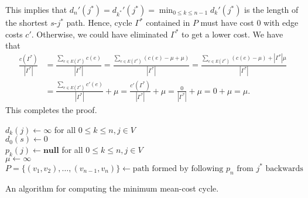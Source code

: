 \documentclass[letterpaper,reqno,12pt]{article}
\begin{document}
\begin{exercise}
  This implies that $d_n'(j^*) = d_{k^*}'(j^*) = \min_{0 \leq k \leq n - 1} d_k'(j^*)$ is the length of the shortest $s$-$j^*$ path. Hence, cycle $\Gamma^*$ contained in $P$ must have cost $0$ with edge costs $c'$. Otherwise, we could have eliminated $\Gamma^*$ to get a lower cost. We have that
  \begin{align*}
    \frac{c\left(\Gamma^*\right)}{\left|\Gamma^*\right|} &= \frac{\sum_{e \in E\left(\Gamma^*\right)} c(e)}{\left|\Gamma^*\right|} = \frac{\sum_{e \in E\left(\Gamma^*\right)} (c(e) - \mu + \mu)}{\left|\Gamma^*\right|} = \frac{\sum_{e \in E\left(\Gamma^*\right)} (c(e) - \mu) + \left|\Gamma^*\right| \mu}{\left|\Gamma^*\right|} \\
    &= \frac{\sum_{e \in E\left(\Gamma^*\right)} c'(e)}{\left|\Gamma^*\right|} + \mu = \frac{c'\left(\Gamma^*\right)}{\left|\Gamma^*\right|} + \mu = \frac{0}{\left|\Gamma^*\right|} + \mu = 0 + \mu = \mu.
  \end{align*}
  This completes the proof.

  \begin{algorithm}
    $d_k(j) \leftarrow \infty$ for all $0 \leq k \leq n, j \in V$ \\
    $d_0(s) \leftarrow 0$ \\
    $p_k(j) \leftarrow \textbf{null}$ for all $0 \leq k \leq n, j \in V$ \\
    $\mu \leftarrow \infty$ \\
    $P = \{ (v_1, v_2), \ldots, (v_{n - 1}, v_n) \} \leftarrow \text{path formed by following $p_n$ from $j^*$ backwards}$ \\
    \caption{An algorithm for computing the minimum mean-cost cycle.}
    \label{alg:min-mean-cost-cycle}
  \end{algorithm}
\end{exercise}
\end{document}

